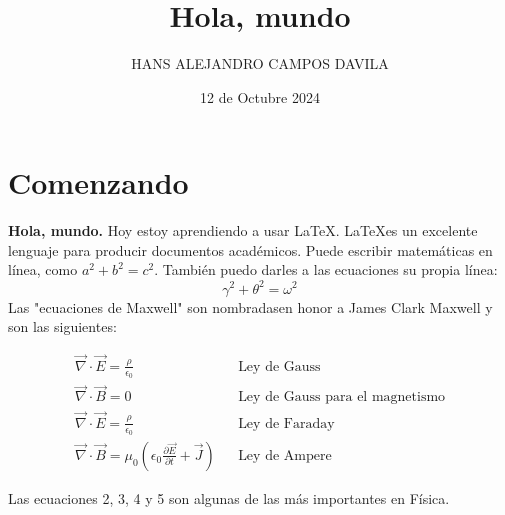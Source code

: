 \documentclass{article}
\begin{document}
\title{Hola, mundo}
\author{HANS ALEJANDRO CAMPOS DAVILA}
\date{12 de Octubre 2024}

\maketitle
\section{Comenzando}
\textbf{Hola, mundo.} Hoy estoy aprendiendo a usar \LaTeX . \LaTeX es un excelente lenguaje para producir documentos académicos. Puede escribir matemáticas en línea, como $a^2+b^2=c^2$. También puedo darles a las ecuaciones su propia línea:
\begin{equation}
\gamma^2+\theta^2=\omega^2    
\end{equation}
Las  "ecuaciones de Maxwell" son nombradasen honor a James Clark Maxwell y son las siguientes:
\begin{equations}
    \begin{align}
        \vec{\nabla}\cdot\vec{E} =\frac{\rho}{\epsilon_0}  && \text{Ley de Gauss} \\
        \vec{\nabla}\cdot\vec{B} =0 && \text{Ley de Gauss para el magnetismo} \\    
        \vec{\nabla}\cdot\vec{E} =\frac{\rho}{\epsilon_0} && \text{Ley de Faraday} \\
        \vec{\nabla}\cdot\vec{B} =\mu_0(\epsilon_0\frac{\partial\vec{E}}{\partial t}+\vec{J}) && \text{Ley de Ampere}
    \end{align}
\end{equations}


    Las ecuaciones 2, 3, 4 y 5 son algunas de las más importantes en Física.
    \maketitle
\end{document}
